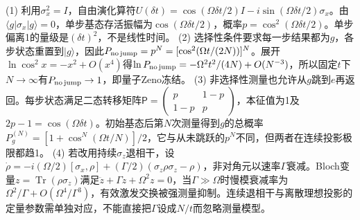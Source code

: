 (1) 利用\(\sigma_x^2=I\)，自由演化算符\(U(\delta t)=\cos(\Omega\delta t/2)I-i\sin(\Omega\delta t/2)\sigma_x\)。由\(\langle g|\sigma_x|g\rangle=0\)，单步基态存活振幅为\(\cos(\Omega\delta t/2)\)，概率\(p=\cos^2(\Omega\delta t/2)\)。单步偏离1的量级是\((\delta t)^2\)，不是线性时间。
(2) 选择性条件要求每一步结果都为\(g\)，各步状态重置到\(|g\rangle\)，因此\(P_{\rm no\,jump}=p^N=[\cos^2(\Omega t/(2N))]^N\)。展开\(\ln\cos^2x=-x^2+O(x^4)\)得\(\ln P_{\rm no\,jump}=-\Omega^2t^2/(4N)+O(N^{-3})\)，所以固定\(t\)下\(N\to\infty\)有\(P_{\rm no\,jump}\to1\)，即量子Zeno冻结。
(3) 非选择性测量也允许从\(g\)跳到\(e\)再返回。每步状态满足二态转移矩阵\(\mathsf P=\begin{pmatrix}p&1-p\\1-p&p\end{pmatrix}\)，本征值为1及\(2p-1=\cos(\Omega\delta t)\)。初始基态后第\(N\)次测量得到\(g\)的总概率\(P_g^{(N)}=[1+\cos^N(\Omega t/N)]/2\)，它与从未跳跃的\(p^N\)不同，但两者在连续投影极限都趋1。
(4) 若改用持续\(\sigma_z\)退相干，设\(\dot\rho=-i(\Omega/2)[\sigma_x,\rho]+(\Gamma/2)(\sigma_z\rho\sigma_z-\rho)\)，非对角元以速率\(\Gamma\)衰减。Bloch变量\(z=\operatorname{Tr}(\rho\sigma_z)\)满足\(\ddot z+\Gamma\dot z+\Omega^2z=0\)，当\(\Gamma\gg\Omega\)时慢模衰减率为\(\Omega^2/\Gamma+O(\Omega^4/\Gamma^3)\)，有效激发交换被强测量抑制。连续退相干与离散理想投影的定量参数需单独对应，不能直接把\(\Gamma\)设成\(N/t\)而忽略测量模型。
